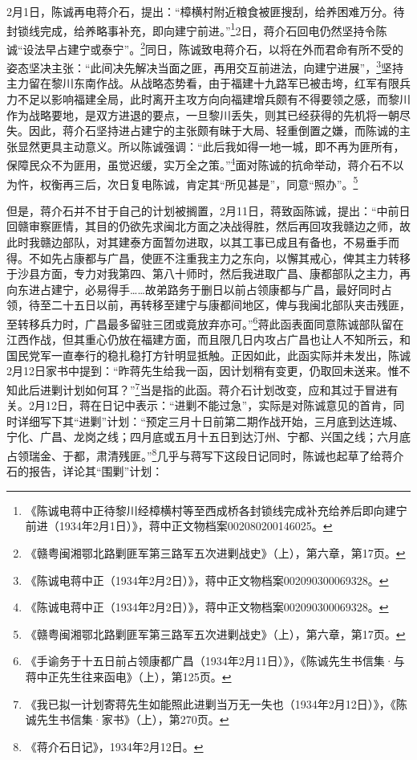 2月1日，陈诚再电蒋介石，提出：“樟横村附近粮食被匪搜刮，给养困难万分。待封锁线完成，给养略事补充，即向建宁前进。”\footnote{《陈诚电蒋中正待黎川经樟横村等至西成桥各封锁线完成补充给养后即向建宁前进（1934年2月1日）》，蒋中正文物档案002080200146025。}2日，蒋介石回电仍然坚持令陈诚“设法早占建宁或泰宁”。\footnote{《赣粤闽湘鄂北路剿匪军第三路军五次进剿战史》（上），第六章，第17页。}同日，陈诚致电蒋介石，以将在外而君命有所不受的姿态坚决主张：“此间决先解决当面之匪，再用交互前进法，向建宁进展”，\footnote{《陈诚电蒋中正（1934年2月2日）》，蒋中正文物档案002090300069328。}坚持主力留在黎川东南作战。从战略态势看，由于福建十九路军已被击垮，红军有限兵力不足以影响福建全局，此时离开主攻方向向福建增兵颇有不得要领之感，而黎川作为战略要地，是双方进退的要点，一旦黎川丢失，则其已经获得的先机将一朝尽失。因此，蒋介石坚持进占建宁的主张颇有昧于大局、轻重倒置之嫌，而陈诚的主张显然更具主动意义。所以陈诚强调：“此后我如得一地一城，即不再为匪所有，保障民众不为匪用，虽觉迟缓，实万全之策。”\footnote{《陈诚电蒋中正（1934年2月2日）》，蒋中正文物档案002090300069328。}面对陈诚的抗命举动，蒋介石不以为忤，权衡再三后，次日复电陈诚，肯定其“所见甚是”，同意“照办”。\footnote{《赣粤闽湘鄂北路剿匪军第三路军五次进剿战史》（上），第六章，第17页。}


但是，蒋介石并不甘于自己的计划被搁置，2月11日，蒋致函陈诚，提出：“中前日回赣审察匪情，其目的仍欲先求闽北方面之决战得胜，然后再回攻我赣边之师，故此时我赣边部队，对其建泰方面暂勿进取，以其工事已成且有备也，不易垂手而得。不如先占康都与广昌，使匪不注重我主力之东向，以懈其戒心，俾其主力转移于沙县方面，专力对我第四、第八十师时，然后我进取广昌、康都部队之主力，再向东进占建宁，必易得手……故弟路务于删日以前占领康都与广昌，最好同时占领，待至二十五日以前，再转移至建宁与康都间地区，俾与我闽北部队夹击残匪，至转移兵力时，广昌最多留驻三团或竟放弃亦可。”\footnote{《手谕务于十五日前占领康都广昌（1934年2月11日）》，《陈诚先生书信集·与蒋中正先生往来函电》（上），第125页。}蒋此函表面同意陈诚部队留在江西作战，但其重心仍放在福建方面，而且限几日内攻占广昌也让人不知所云，和国民党军一直奉行的稳扎稳打方针明显抵触。正因如此，此函实际并未发出，陈诚2月12日家书中提到：“昨蒋先生给我一函，因计划稍有变更，仍取回未送来。惟不知此后进剿计划如何耳？”\footnote{《我已拟一计划寄蒋先生如能照此进剿当万无一失也（1934年2月12日）》，《陈诚先生书信集·家书》（上），第270页。}当是指的此函。蒋介石计划改变，应和其过于冒进有关。2月12日，蒋在日记中表示：“进剿不能过急”，实际是对陈诚意见的首肯，同时详细写下其“进剿”计划：“预定三月十日前第二期作战开始，三月底到达连城、宁化、广昌、龙岗之线；四月底或五月十五日到达汀州、宁都、兴国之线；六月底占领瑞金、于都，肃清残匪。”\footnote{《蒋介石日记》，1934年2月12日。}几乎与蒋写下这段日记同时，陈诚也起草了给蒋介石的报告，详论其“围剿”计划：

